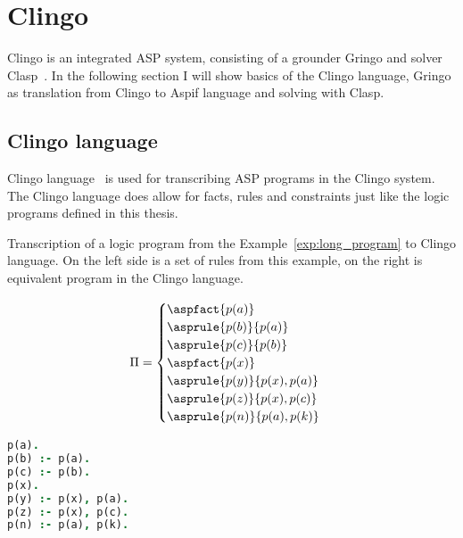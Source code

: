 \section{Clingo}

Clingo is an integrated ASP system, consisting of a grounder Gringo and solver
Clasp~\cite{aspEasy2016}. In the following section I will show basics of the
Clingo language, Gringo as translation from Clingo to Aspif language and
solving with Clasp.

\subsection{Clingo language}
Clingo language~\cite{gebser2019potassco} is used for transcribing ASP programs
in the Clingo system.
The Clingo language does allow for facts, rules and constraints just like
the logic programs defined in this thesis.

\begin{example}
    Transcription of a logic program from the Example~\ref{exp:long_program} to Clingo language.
    On the left side is a set of rules from this example,
    on the right is equivalent program in the Clingo language.

    \begin{minipage}{.4\textwidth}
    \begin{equation*}
        \Pi =
            \begin{cases}
                \aspfact{p(a)}\\
                \asprule{p(b)}{p(a)}\\
                \asprule{p(c)}{p(b)}\\
                \aspfact{p(x)}\\
                \asprule{p(y)}{p(x), p(a)}\\
                \asprule{p(z)}{p(x), p(c)}\\
                \asprule{p(n)}{p(a), p(k)}\\
            \end{cases}
    \end{equation*}
    \end{minipage}
    \hfill
    \begin{minipage}{.4\textwidth}
        \vspace{1em}
        \begin{lstlisting}[language=Prolog, numbers=none, basicstyle=\linespread{1.25}\normalsize]
p(a).
p(b) :- p(a).
p(c) :- p(b).
p(x).
p(y) :- p(x), p(a).
p(z) :- p(x), p(c).
p(n) :- p(a), p(k).
\end{lstlisting}
    \end{minipage}
\end{example}

